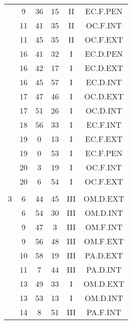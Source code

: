 \documentclass[12pt, a4paper]{article}
\begin{document}
\begin{multicols}{3}
{\begin{tabular}{c c c c c c}
	 	 	 	 & 9 & 36 & 15 & II & EC.F.PEN\\%
	 	 	 	 & 11 & 41 & 35 & II & OC.F.INT\\%
	 	 	 	 & 11 & 45 & 35 & II & OC.F.EXT\\%
	 	 	 	 & 16 & 41 & 32 & I & EC.D.PEN\\%
	 	 	 	 & 16 & 42 & 17 & I & EC.D.EXT\\%
	 	 	 	 & 16 & 45 & 57 & I & EC.D.INT\\%
	 	 	 	 & 17 & 47 & 46 & I & OC.D.EXT\\%
	 	 	 	 & 17 & 51 & 26 & I & OC.D.INT\\%
	 	 	 	 & 18 & 56 & 33 & I & EC.F.INT\\%
	 	 	 	 & 19 & 0 & 13 & I & EC.F.EXT\\%
	 	 	 	 & 19 & 0 & 53 & I & EC.F.PEN\\%
	 	 	 	 & 20 & 3 & 19 & I & OC.F.INT\\%
	 	 	 	 & 20 & 6 & 54 & I & OC.F.EXT\\%
	 	 	 	 & & & & & \\%
	 	 	 	3 & 6 & 44 & 45 & III & OM.D.EXT\\%
	 	 	 	 & 6 & 54 & 30 & III & OM.D.INT\\%
	 	 	 	 & 9 & 47 & 3 & III & OM.F.INT\\%
	 	 	 	 & 9 & 56 & 48 & III & OM.F.EXT\\%
	 	 	 	 & 10 & 58 & 19 & III & PA.D.EXT\\%
	 	 	 	 & 11 & 7 & 44 & III & PA.D.INT\\%
	 	 	 	 & 13 & 49 & 33 & I & OM.D.EXT\\%
	 	 	 	 & 13 & 53 & 13 & I & OM.D.INT\\%
	 	 	 	 & 14 & 8 & 51 & III & PA.F.INT\\%

\end{tabular}}
\end{multicols}
\end{document}
